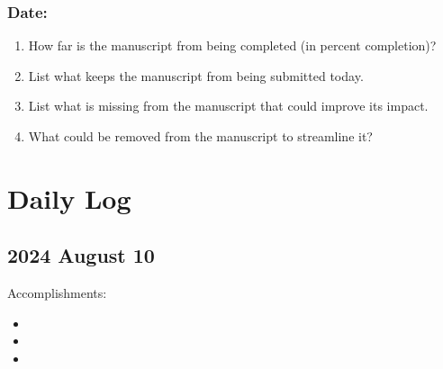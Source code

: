 \documentclass[11pt,letterpaper]{article}
\begin{document}
\subsubsection{Date:}
\label{sec:org2f83dfa}



\begin{enumerate}
\item How far is the manuscript from being completed (in percent completion)?
\label{sec:orgf92b3c3}





\item List what keeps the manuscript from being submitted today.
\label{sec:org9a06e76}





\item List what is missing from the manuscript that could improve its impact.
\label{sec:orgfe40660}






\item What could be removed from the manuscript to streamline it?
\label{sec:org8d843c8}
\end{enumerate}




\section{Daily Log}
\label{sec:orgd71bb8f}



\subsection{2024 August 10}
\label{sec:org9956e50}

Accomplishments:

\begin{itemize}
\item 

\item 

\item 
\end{itemize}
\end{document}
